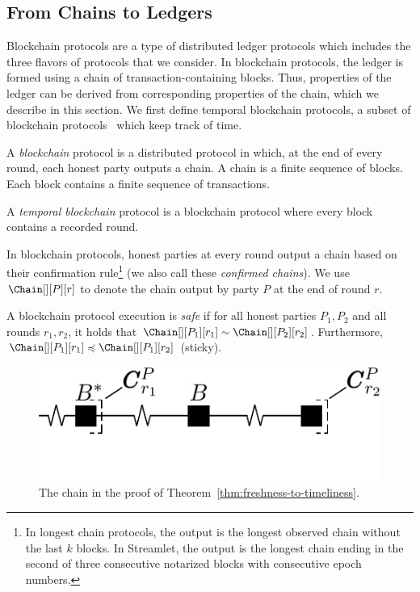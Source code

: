 \subsection{From Chains to Ledgers}

Blockchain protocols are a type of distributed ledger protocols which includes the three flavors of protocols that we consider.
In blockchain protocols, the ledger is formed using a chain of transaction-containing blocks. Thus, properties of the ledger can be derived from corresponding properties of the chain, which we describe in this section.
We first define temporal blockchain protocols,
a subset of blockchain protocols~\cite{rethinking-consensus}
which keep track of time.

\begin{definition}
  A \emph{blockchain} protocol is a distributed protocol
  in which, at the end of every round, each honest party outputs
  a chain. A chain is a finite sequence of blocks. Each block
  contains a finite sequence of transactions.

  A \emph{temporal blockchain} protocol is a blockchain protocol
  where every block contains a recorded round.
\end{definition}

In blockchain protocols, honest parties at every round output a chain
based on their confirmation rule\footnote{
  In longest chain protocols, the output is the longest observed chain without the last $k$ blocks.
  In Streamlet, the output is the longest chain ending in the second of three consecutive notarized
  blocks with consecutive epoch numbers.
} (we also call these \emph{confirmed chains}).
We use $\Chain[][P][r]$ to denote the chain output
by party $P$ at the end of round $r$.

\begin{definition}
  A blockchain protocol execution is \emph{safe} if for
  all honest parties $P_1, P_2$ and all rounds $r_1, r_2$,
  it holds that $\Chain[][P_1][r_1] \sim \Chain[][P_2][r_2]$.
  Furthermore, $\Chain[][P_1][r_1] \preccurlyeq \Chain[][P_1][r_2]$ (sticky).
\end{definition}

\ifccs
  \begin{figure}
    \centering
    \includegraphics[width=0.7\columnwidth,keepaspectratio]{figures/freshness-timeliness.pdf}
    \caption{The chain in the proof of Theorem~\ref{thm:freshness-to-timeliness}.}
    \label{fig:freshness-to-timeliness}
  \end{figure}
\fi

